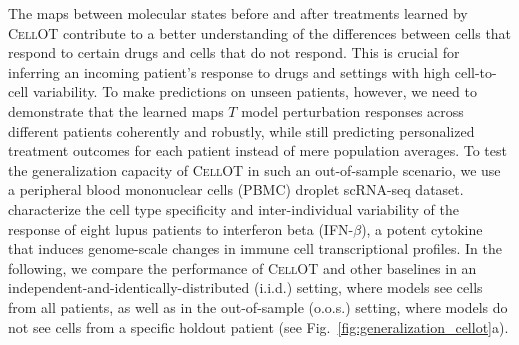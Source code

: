 The maps between molecular states before and after treatments learned by \textsc{CellOT} contribute to a better understanding of the differences between cells that respond to certain drugs and cells that do not respond. This is crucial for inferring an incoming patient's response to drugs and settings with high cell-to-cell variability.
To make predictions on unseen patients, however, we need to demonstrate that the learned maps $T$ model perturbation responses across different patients coherently and robustly, while still predicting personalized treatment outcomes for each patient instead of mere population averages.
To test the generalization capacity of \textsc{CellOT} in such an out-of-sample scenario, we use a peripheral blood mononuclear cells (PBMC) droplet scRNA-seq dataset. \citet{kang2018multiplexed} characterize the cell type specificity and inter-individual variability of the response of eight lupus patients to interferon beta (IFN-$\beta$), a potent cytokine that induces genome-scale changes in immune cell transcriptional profiles. 
In the following, we compare the performance of \textsc{CellOT} and other baselines in an independent-and-identically-distributed (i.i.d.) setting, where models see cells from all patients, as well as in the out-of-sample (o.o.s.) setting, where models do not see cells from a specific holdout patient (see Fig.~\ref{fig:generalization_cellot}a).


